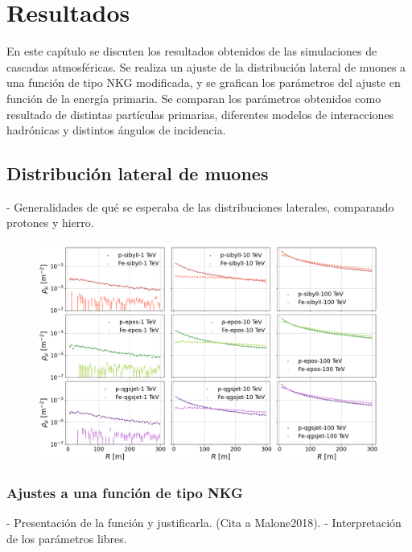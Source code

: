 \documentclass[12pt,letterpaper]{report}
\begin{document}
\chapter{Resultados}

En este cap\'itulo se discuten los resultados obtenidos de las simulaciones de cascadas atmosf\'ericas. Se realiza un ajuste de la distribuci\'on lateral de muones a una funci\'on de tipo NKG modificada, y se grafican los par\'ametros del ajuste en funci\'on de la energ\'ia primaria. Se comparan los par\'ametros obtenidos como resultado de distintas part\'iculas primarias, diferentes modelos de interacciones hadr\'onicas y distintos \'angulos de incidencia.

\section{Distribuci\'on lateral de muones}
- Generalidades de qu\'e se esperaba  de las distribuciones laterales, comparando protones y hierro.

	\begin{figure}[H] \label{fig:lateraldist}
	\includegraphics[width=\textwidth]{Figuras/lateraldist}
	\end{figure}

	\subsection{Ajustes a una funci\'on de tipo NKG}
	- Presentaci\'on de la funci\'on y justificarla. (Cita a Malone2018).
	- Interpretaci\'on de los par\'ametros libres.
	
\end{document}
